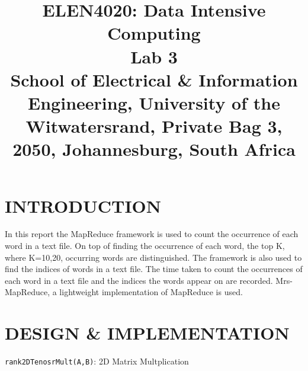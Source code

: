 \documentclass[conference]{IEEEtran}
\begin{document}
\title{ELEN4020: Data Intensive Computing\\ Lab 3\\
{\footnotesize School of Electrical \& Information Engineering, University of the
Witwatersrand, Private Bag 3, 2050, Johannesburg, South Africa}
}


\author{

\and
{}
\and
{}

}

\maketitle

\section{INTRODUCTION}
In this report the MapReduce framework is used to count the occurrence of each word in a text file. On top of finding the occurrence of each word, the top K, where K=10,20, occurring words are distinguished. The framework is also used to find the indices of words in a text file. The time taken to count the occurrences of each word in a text file and the indices the words appear on are recorded. Mrs-MapReduce, a lightweight implementation of MapReduce is used. 



%
\section{DESIGN \& IMPLEMENTATION}

\linesnumbered
\begin{algorithm}

\centring



\caption{\texttt{rank2DTenosrMult(A,B)}: 2D Matrix Multplication}

\Return \C
\label{mult2d}
\end{algorithm}




\end{document}
